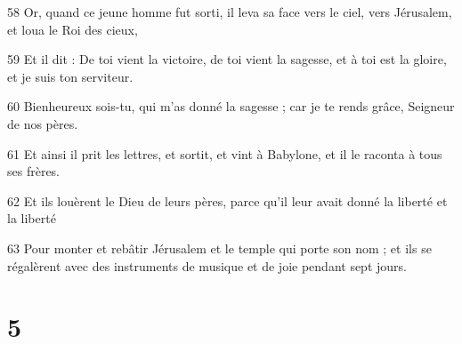\par 58 Or, quand ce jeune homme fut sorti, il leva sa face vers le ciel, vers Jérusalem, et loua le Roi des cieux,
\par 59 Et il dit : De toi vient la victoire, de toi vient la sagesse, et à toi est la gloire, et je suis ton serviteur.
\par 60 Bienheureux sois-tu, qui m'as donné la sagesse ; car je te rends grâce, Seigneur de nos pères.
\par 61 Et ainsi il prit les lettres, et sortit, et vint à Babylone, et il le raconta à tous ses frères.
\par 62 Et ils louèrent le Dieu de leurs pères, parce qu'il leur avait donné la liberté et la liberté
\par 63 Pour monter et rebâtir Jérusalem et le temple qui porte son nom ; et ils se régalèrent avec des instruments de musique et de joie pendant sept jours.

\chapter{5}

